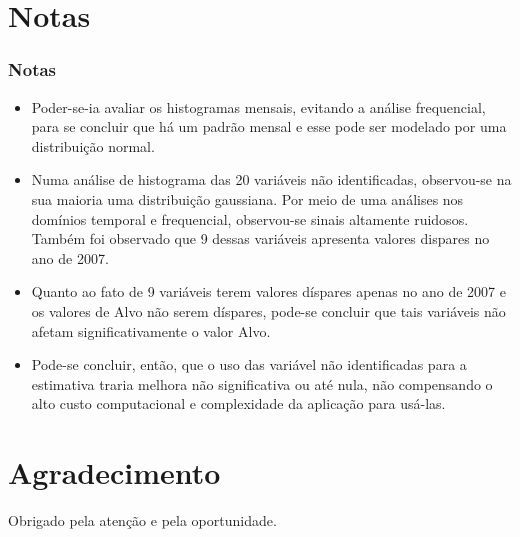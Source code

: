 \documentclass[xcolor=dvipsnames,xcolor=table]{beamer}
\begin{document}
\section{Notas}
\begin{frame}\frametitle{Notas}

\begin{itemize}
\item Poder-se-ia avaliar os histogramas mensais, evitando a análise frequencial, para se concluir que há um padrão mensal e esse pode ser modelado por uma distribuição normal. 
\item Numa análise de histograma das 20 variáveis não identificadas, observou-se na sua maioria uma distribuição gaussiana. Por meio de uma análises nos domínios temporal e frequencial, observou-se sinais altamente ruidosos. Também foi observado que 9 dessas variáveis apresenta valores dispares no ano de 2007. 
\item Quanto ao fato de 9 variáveis terem valores díspares apenas no ano de 2007 e os valores de Alvo não serem díspares, pode-se concluir que tais variáveis não afetam significativamente o valor Alvo.
\item Pode-se concluir, então, que o uso das variável não identificadas para a estimativa traria melhora não significativa ou até nula, não compensando o alto custo computacional e complexidade da aplicação para usá-las.
\end{itemize}

\end{frame}


\section*{Agradecimento}
\begin{frame}
Obrigado pela atenção e pela oportunidade.
\end{frame}


%  
%

\end{document}

